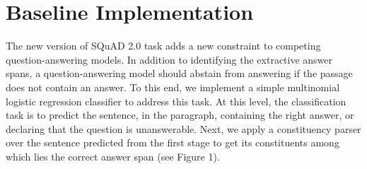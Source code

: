 \section{Baseline Implementation}

The new version of SQuAD 2.0 task adds a new constraint to competing question-answering models. In addition to identifying the extractive answer spans, a question-answering model should abstain from answering if the passage does not contain an answer. To this end, we implement a simple multinomial logistic regression classifier to address this task. At this level, the classification task is to predict the sentence, in the paragraph, containing the right answer, or declaring that the question is unanswerable. Next, we apply a constituency parser over the sentence predicted from the first stage to get its constituents among which lies the correct answer span (see Figure 1).  


